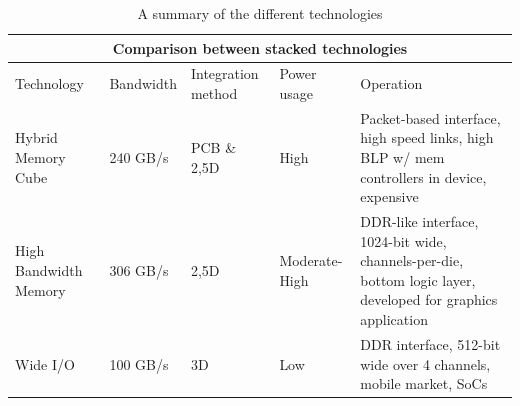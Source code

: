 \begin{table}[h!]
    \centering
    \begin{tabular}{ |p{}||p{}|p{}|p{}|p{}|  }
        \hline
        \multicolumn{5}{|c|}{Comparison between stacked technologies} \\
        \hline
        Technology & Bandwidth & Integration method & Power usage & Operation\\
        \hline
        Hybrid Memory Cube    & 240 GB/s & PCB \& 2,5D & High           & Packet-based interface, high speed links, high BLP w/ mem controllers in device, expensive\\
        High Bandwidth Memory & 306 GB/s & 2,5D        & Moderate-High  & DDR-like interface, 1024-bit wide, channels-per-die, bottom logic layer, developed for graphics application\\
        Wide I/O              & 100 GB/s & 3D          & Low            & DDR interface, 512-bit wide over 4 channels, mobile market, SoCs\\
        \hline
    \end{tabular}
    \caption{A summary of the different technologies}
    \label{tab:tech-compare}
\end{table}
